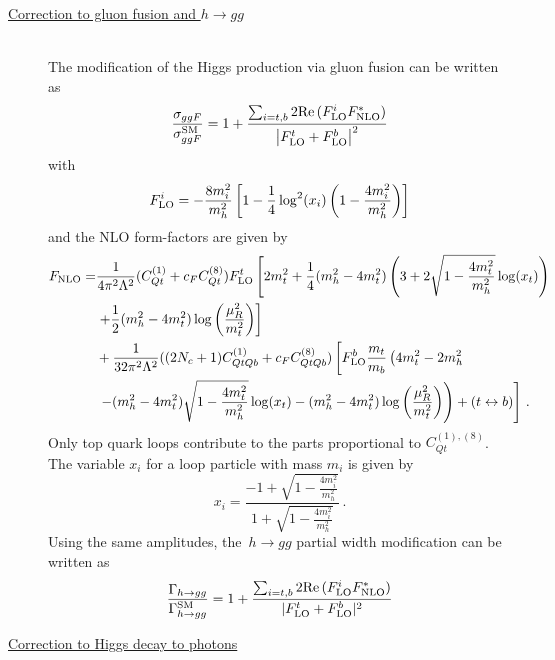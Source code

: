 \begin{description}
	\item [\underline{Correction to gluon fusion and $h\to gg $ }] \hfill \vspace{0.3cm} \\
	The modification of the Higgs production via gluon fusion can be written as
	\begin{equation}
		\frac{\sigma_{ggF}}{\sigma_{ggF}^{\mathrm{SM}}}= 1+ \frac{ \sum_{i=t,b} 2 \mbox{Re}\,(F_{\textrm{LO}}^i F^*_{\textrm{NLO}})}{\left| F_{\textrm{LO}}^t+F_{\textrm{LO}}^b  \right|^2} \label{eq:production}
	\end{equation}
	with 
	\begin{equation}
		F_{\textrm{LO}}^i=-\frac{8m_i^2}{m_h^2}\left[1-\frac{1}{4}\log^2(x_i)\left(1-\frac{4m_i^2}{m_h^2}\right)\right]
	\end{equation}
	and the NLO form-factors are given by
	\begin{equation}
		\begin{split}
			F_{\textrm{NLO}}=&\frac{ 1}{4\pi^2  \Lambda^2}(C_{Qt}^{(1)}+c_FC_{Qt}^{(8)})F_{\textrm{LO}}^t \left[ 2 m_t^2  +\frac{1}{4} (m_h^2-4 m_t^2) \left( 3 +2 \sqrt{1-\frac{4 m_t^2}{m_h^2}} \log(x_t) \right)  \right. \\ & \left.
			+\frac{1}{2} (m_h^2-4 m_t^2) \log\left(\frac{\mu_R^2}{m_t^2}\right)\right] \\ & + 
			\frac{1}{32 \pi^2 \Lambda^2} ((2N_c+1)C_{QtQb}^{(1)}+c_FC_{QtQb}^{(8)}) \left[ F_{\textrm{LO}}^b \frac{m_t}{m_b}\left( 4 m_t^2-2 m_h^2 \right. \right.\\ & \left. \left. - (m_h^2-4 m_t^2)\sqrt{1-\frac{4 m_t^2}{m_h^2}} \log(x_t)-(m_h^2-4 m_t^2)\log\left(\frac{\mu_R^2}{m_t^2}\right)\right) +(t\leftrightarrow b)\right]  \,. \label{eq:FNLO}
		\end{split}
	\end{equation}
	Only top quark loops contribute to the parts proportional to $C_{Qt}^{(1),(8)}$. 
	The variable $x_i$ for a loop particle with mass $m_i$ is given by
	\begin{equation}
		x_i=\frac{-1+\sqrt{1-\frac{4 m_i^2}{m_h^2}}}{1+\sqrt{1-\frac{4 m_i^2}{m_h^2}}}\,. \label{eq:xvariable}
	\end{equation} 
Using the same amplitudes, the~$ h \to gg$  partial width modification  can be written as
\begin{equation}
	\frac{\Gamma_{h\to gg}}{\Gamma_{h\to gg}^{\mathrm{SM}}}= 1+ \frac{ \sum_{i=t,b} 2 \mbox{Re}\,(F_{\textrm{LO}}^i F^*_{\textrm{NLO}})}{ |F_{\textrm{LO}}^t+F_{\textrm{LO}}^b|^2} 
\end{equation}
	\item [\underline{Correction to Higgs decay to photons }] \hfill  \vspace{0.3cm} \\

\end{description}
